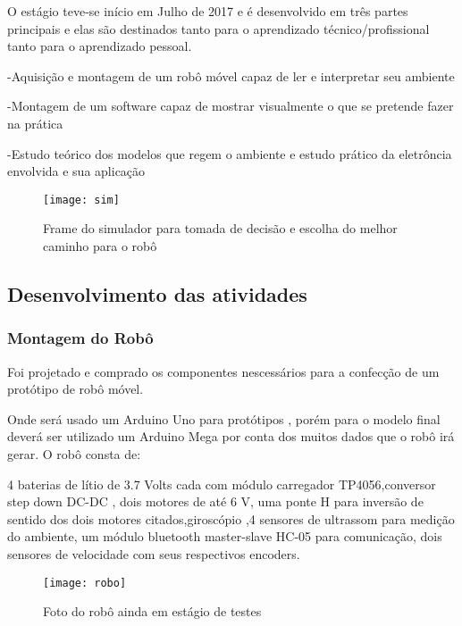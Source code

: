 \documentclass[11pt,a4paper]{article}
\begin{document}
\hspace{1.5cm} O estágio teve-se início em Julho de 2017 e é desenvolvido em três partes principais e elas são destinados tanto para o aprendizado técnico/profissional tanto para o aprendizado pessoal.

-Aquisição e montagem de um robô móvel capaz de ler e interpretar seu ambiente

-Montagem de um software capaz de mostrar visualmente o que se pretende fazer na prática

-Estudo teórico dos modelos que regem o ambiente e estudo prático da eletrôncia envolvida e sua aplicação\\
\begin{figure}[!h]
\centering
\texttt{[image: sim]}
\caption{Frame do simulador para tomada de decisão e escolha do melhor caminho para o robô}
\end{figure}
\subsection{Desenvolvimento das atividades}
\subsubsection{Montagem do Robô}
\hspace{1.5cm}Foi projetado e comprado os componentes nescessários para a confecção de um protótipo de robô móvel. 

Onde será usado um Arduino Uno para protótipos , porém para o modelo final deverá ser utilizado um Arduino Mega por conta dos muitos dados que o robô irá gerar. O robô consta de:

4 baterias de lítio de 3.7 Volts cada com módulo carregador TP4056,conversor step down DC-DC , dois motores de até 6 V, uma ponte H para inversão de sentido dos dois motores citados,giroscópio ,4 sensores de ultrassom para medição do ambiente, um módulo bluetooth master-slave HC-05 para comunicação, dois sensores de velocidade com seus respectivos encoders.  \\
\begin{figure}[!h]
\centering
\texttt{[image: robo]}
\caption{Foto do robô ainda em estágio de testes}
\end{figure}
\\
\end{document}
